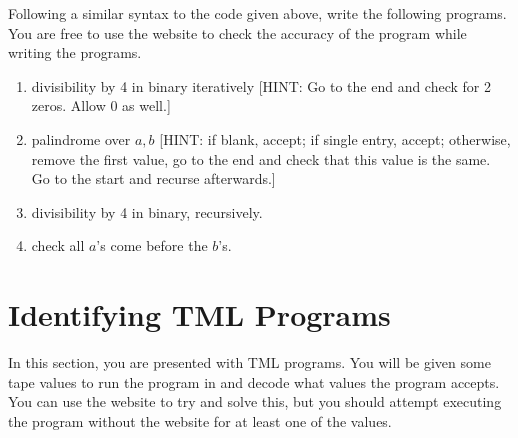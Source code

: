 \documentclass[answers]{exam}
\begin{document}
    Following a similar syntax to the code given above, write the following programs. You are free to use the website to check the accuracy of the program while writing the programs.
    \begin{enumerate}
        \item divisibility by 4 in binary iteratively [HINT: Go to the end and check for 2 zeros. Allow 0 as well.]
        \begin{solution}
            \vspace*{540pt}
        \end{solution}
                
        \item palindrome over $a, b$ [HINT: if blank, accept; if single entry, accept; otherwise, remove the first value, go to the end and check that this value is the same. Go to the start and recurse afterwards.]
        \begin{solution}
            \vspace*{560pt}
        \end{solution}
        
        \item divisibility by 4 in binary, recursively.
        \begin{solution}
            \vspace*{570pt}
        \end{solution}

        \item check all $a$'s come before the $b$'s.
        \begin{solution}
            \vspace*{570pt}
        \end{solution}

    \end{enumerate}
    \newpage

    \section{Identifying TML Programs}
    In this section, you are presented with TML programs. You will be given some tape values to run the program in and decode what values the program accepts. You can use the website to try and solve this, but you should attempt executing the program without the website for at least one of the values.
\end{document}
